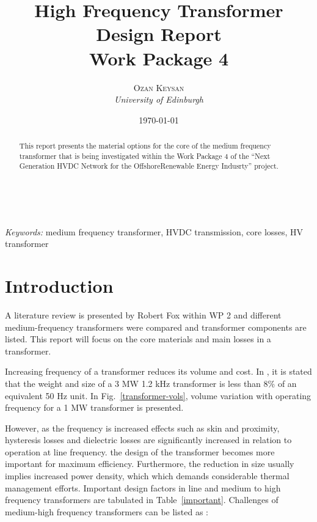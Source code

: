 \documentclass[a4paper, 11pt]{article} %
\title{\textbf{High Frequency Transformer Design Report}\\ %
Work Package 4} %
\author{\textsc{Ozan Keysan} %
\\{\textit{University of Edinburgh}}} %
\date{\today} %
\makeatletter
\renewcommand{\maketitle}{ %
\begin{flushright} %
{\LARGE\@title} %

\vspace{50pt} %

{\large\@author} %
\\\@date %

\vspace{40pt} %
\end{flushright}
}
\makeatother
\begin{document}
\maketitle %



\begin{abstract}
This report presents the material options for the core of the medium frequency transformer that is being investigated within the Work Package 4 of the ``Next Generation HVDC Network for the OffshoreRenewable Energy Indusrty'' project. 
\end{abstract}

\hspace*{3,6mm}\textit{Keywords:} medium frequency transformer, HVDC transmission, core losses, HV transformer %

\vspace{30pt} %


\section{Introduction}


A literature review is presented by Robert Fox within WP 2 and different medium-frequency transformers were compared and transformer components are listed. This report will focus on the core materials and main losses in a transformer.


Increasing frequency of a transformer reduces its volume and cost. In \cite{Prasai2007}, it is stated that the weight and size of a 3 MW 1.2 kHz transformer is less than 8\% of an equivalent 50 Hz unit. In Fig.~\ref{transformer-vols}, volume variation with operating frequency for a 1 MW transformer is presented.

However, as the frequency is increased effects such as skin and proximity, hysteresis losses and dielectric losses are significantly increased in relation to operation at line frequency. the design of the transformer becomes more important for maximum efficiency. Furthermore, the reduction in size usually implies increased power density, which which demands considerable thermal management efforts. 
Important design factors in line and medium to high frequency transformers are tabulated in Table~\ref{important}.
Challenges of medium-high frequency transformers can be listed as 
 \cite{Villar2010}:
\end{document}
